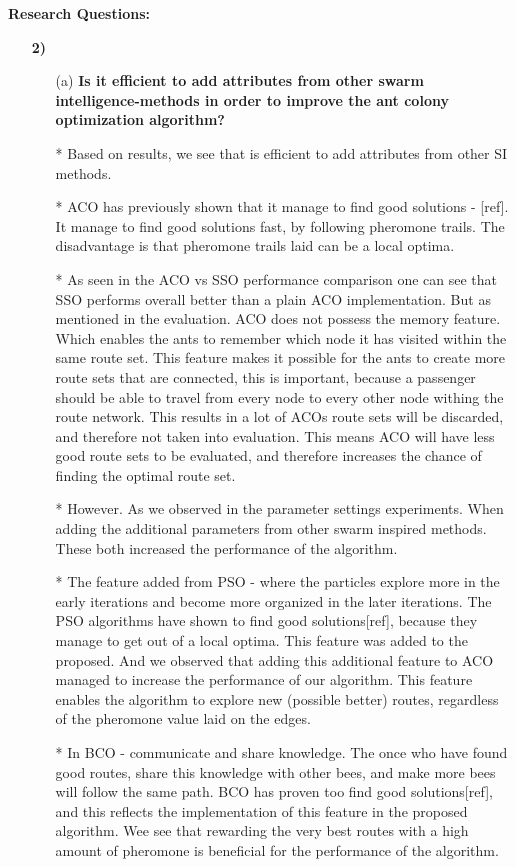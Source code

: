 \textbf{Research Questions:}
\begin{enumerate}[label=\textbf{\arabic*})]
\item[\textbf{2)}]
    \begin{enumerate}

    \item[(a)]  \textbf{Is it efficient to add attributes from other swarm intelligence-methods in order to improve the ant colony optimization algorithm?}

    * Based on results, we see that is efficient to add attributes from other SI methods. 

    * ACO has previously shown that it manage to find good solutions - [ref]. It manage to find good solutions fast, by following pheromone trails. The disadvantage is that pheromone trails laid can be a local optima.
    
    * As seen in the ACO vs SSO performance comparison one can see that SSO performs overall better than a plain ACO implementation. But as mentioned in the evaluation. ACO does not possess the memory feature. Which enables the ants to remember which node it has visited within the same route set. This feature makes it possible for the ants to create more route sets that are connected, this is important, because a passenger should be able to travel from every node to every other node withing the route network. This results in a lot of ACOs route sets will be discarded, and therefore not taken into evaluation. This means ACO will have less good route sets to be evaluated, and therefore increases the chance of finding the optimal route set. 

    * However. As we observed in the parameter settings experiments. When adding the additional parameters from other swarm inspired methods. These both increased the performance of the algorithm. 

    * The feature added from PSO - where the particles explore more in the early iterations and become more organized in the later iterations. The PSO algorithms have shown to find good solutions[ref], because they manage to get out of a local optima. This feature was added to the proposed. And we observed that adding this additional feature to ACO managed to increase the performance of our algorithm. This feature enables the algorithm to explore new (possible better) routes, regardless of the pheromone value laid on the edges.

    * In BCO - communicate and share knowledge. The once who have found good routes, share this knowledge with other bees, and make more bees will follow the same path. BCO has proven too find good solutions[ref], and this reflects the implementation of this feature in the proposed algorithm. Wee see that rewarding the very best routes with a high amount of pheromone is beneficial for the performance of the algorithm. 


\end{enumerate}
\end{enumerate}
